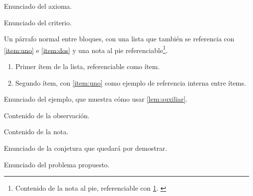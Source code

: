 \begin{axioma}
    Enunciado del axioma.
\end{axioma}

\begin{criterio}
    Enunciado del criterio.
\end{criterio}

Un párrafo normal entre bloques, con una lista que también se
referencia con \cref{item:uno} e \cref{item:dos} y una nota al pie
referenciable\footnote{Contenido de la nota al pie, referenciable con
\cref{fn:nota}. \label{fn:nota}}.

\begin{enumerate}
    \item\label{item:uno} Primer ítem de la lista, referenciable como ítem.
    \item\label{item:dos} Segundo ítem, con \cref{item:uno} como ejemplo de referencia interna entre ítems.
\end{enumerate}

\begin{ejemplo}\label{ej:primero}
    Enunciado del ejemplo, que muestra cómo usar \cref{lem:auxiliar}.
\end{ejemplo}

\begin{observacion}
    Contenido de la observación.
\end{observacion}

\begin{nota}
    Contenido de la nota.
\end{nota}

\begin{conjetura}
    Enunciado de la conjetura que quedará por demostrar.
\end{conjetura}

\begin{problema}
    Enunciado del problema propuesto.
\end{problema}
